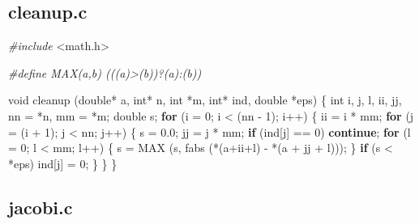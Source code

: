 \documentclass[
  12pt,
]{book}
\newenvironment{Shaded}{\begin{snugshade}}{\end{snugshade}}
\newcommand{\ControlFlowTok}[1]{\textcolor[rgb]{0.13,0.29,0.53}{\textbf{#1}}}
\newcommand{\DataTypeTok}[1]{\textcolor[rgb]{0.13,0.29,0.53}{#1}}
\newcommand{\DecValTok}[1]{\textcolor[rgb]{0.00,0.00,0.81}{#1}}
\newcommand{\FloatTok}[1]{\textcolor[rgb]{0.00,0.00,0.81}{#1}}
\newcommand{\ImportTok}[1]{#1}
\newcommand{\NormalTok}[1]{#1}
\newcommand{\PreprocessorTok}[1]{\textcolor[rgb]{0.56,0.35,0.01}{\textit{#1}}}
\theoremstyle{definition}
\theoremstyle{definition}
\theoremstyle{definition}
\theoremstyle{definition}
\theoremstyle{remark}
\begin{document}
\hypertarget{cleanup.c}{%
\subsection{cleanup.c}\label{cleanup.c}}

\begin{Shaded}
\begin{Highlighting}[]
\PreprocessorTok{\#include }\ImportTok{\textless{}math.h\textgreater{}}

\PreprocessorTok{\#define MAX(a,b) (((a)\textgreater{}(b))?(a):(b))}

\DataTypeTok{void}\NormalTok{ cleanup (}\DataTypeTok{double}\NormalTok{* a, }\DataTypeTok{int}\NormalTok{* n, }\DataTypeTok{int}\NormalTok{ *m, }\DataTypeTok{int}\NormalTok{* ind, }\DataTypeTok{double}\NormalTok{ *eps) \{}
  \DataTypeTok{int}\NormalTok{ i, j, l, ii, jj, nn = *n, mm = *m;}
  \DataTypeTok{double}\NormalTok{ s;}
  \ControlFlowTok{for}\NormalTok{ (i = }\DecValTok{0}\NormalTok{; i \textless{} (nn {-} }\DecValTok{1}\NormalTok{); i++) \{}
\NormalTok{    ii = i * mm;}
    \ControlFlowTok{for}\NormalTok{ (j = (i + }\DecValTok{1}\NormalTok{); j \textless{} nn; j++) \{}
\NormalTok{      s = }\FloatTok{0.0}\NormalTok{;}
\NormalTok{      jj = j * mm;}
      \ControlFlowTok{if}\NormalTok{ (ind[j] == }\DecValTok{0}\NormalTok{) }\ControlFlowTok{continue}\NormalTok{;}
      \ControlFlowTok{for}\NormalTok{ (l = }\DecValTok{0}\NormalTok{; l \textless{} mm; l++) \{}
\NormalTok{        s = MAX (s, fabs (*(a+ii+l) {-} *(a + jj + l)));}
\NormalTok{      \}}
      \ControlFlowTok{if}\NormalTok{ (s \textless{} *eps) ind[j] = }\DecValTok{0}\NormalTok{;}
\NormalTok{    \}}
\NormalTok{  \}}
\NormalTok{\}}
\end{Highlighting}
\end{Shaded}

\hypertarget{jacobi.c}{%
\subsection{jacobi.c}\label{jacobi.c}}
\end{document}
